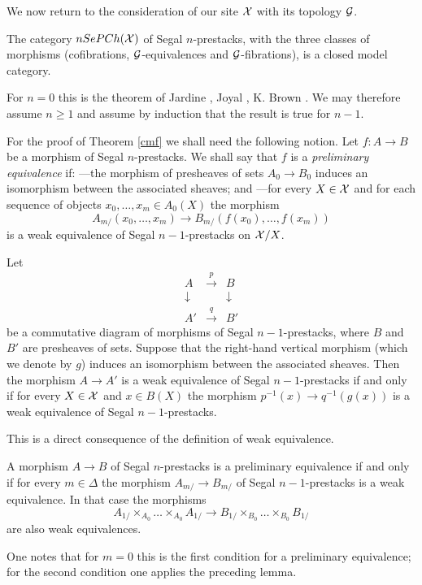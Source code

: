 We now return to the consideration of our site ${\cal X}$ with its
topology ${\cal G}$.

\begin{theorem}
\label{cmf}
The category $nSePCh({\cal X} )$ of Segal $n$-prestacks, with the three
classes of morphisms
(cofibrations, ${\cal G}$-equivalences and ${\cal G}$-fibrations), is a
closed model category.
\end{theorem}

For $n=0$ this is the theorem of
Jardine \cite{Jardine}, Joyal \cite{Joyal}, K.
Brown \cite{KBrown}. We
may therefore assume $n\geq 1$ and assume by induction
that the result is true for $n-1$.

For the proof of Theorem \ref{cmf} we shall need
the following notion. Let $f: A\rightarrow B$ be a morphism of
Segal $n$-prestacks.
We shall say that $f$ is a {\em preliminary equivalence} if:
\newline
---the morphism of presheaves of sets $A_0\rightarrow B_0$ induces an
isomorphism between the associated sheaves; and
\newline
---for every $X\in {\cal X}$ and for each sequence of objects $x_0,\ldots , x_m\in
A_0(X)$
the morphism
$$
A_{m/} (x_0,\ldots , x_m)\rightarrow B_{m/}(f(x_0),\ldots ,f(x_m))
$$
is a weak equivalence of Segal $n-1$-prestacks on ${\cal X} /X$.

\begin{lemma}
Let
$$
\begin{array}{ccc}
A & \stackrel{p}{\rightarrow} & B \\
\downarrow && \downarrow \\
A' & \stackrel{q}{\rightarrow} &B'
\end{array}
$$
be a commutative diagram of morphisms of Segal $n-1$-prestacks, where $B$ and
$B'$ are presheaves of sets. Suppose that the right-hand vertical morphism
(which we denote by $g$) induces an isomorphism between the associated
sheaves. Then
the morphism $A\rightarrow A'$ is a
weak equivalence of Segal $n-1$-prestacks if and only if
for every $X\in {\cal X}$ and $x\in B(X)$ the morphism
$p^{-1}(x)\rightarrow q^{-1}(g(x))$ is a weak equivalence of
Segal $n-1$-prestacks.
\end{lemma}
This is a direct consequence of the definition of weak equivalence.
\eop

\begin{corollary}
\label{etape}
A morphism $A\rightarrow B$ of Segal $n$-prestacks is a preliminary
equivalence if and only if for every $m\in \Delta$ the morphism
$A_{m/} \rightarrow B_{m/}$ of Segal $n-1$-prestacks is a weak
equivalence. In that case the morphisms
$$
A_{1/} \times _{A_0}\ldots \times _{A_0} A_{1/}\rightarrow
B_{1/} \times _{B_0}\ldots \times _{B_0} B_{1/}
$$
are also weak equivalences.
\end{corollary}
One notes that for $m=0$ this is the first condition for a
preliminary equivalence;  for the second condition one applies the
preceding lemma.
\eop

